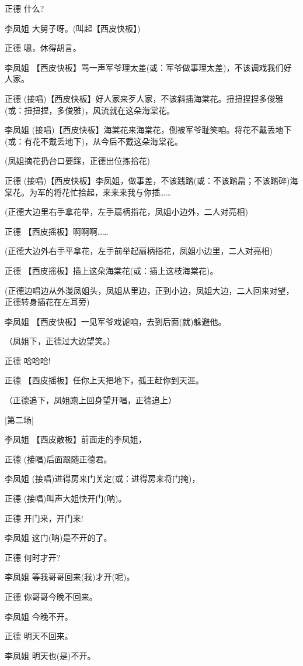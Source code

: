 正德 什么?

李凤姐 大舅子呀。(叫起【西皮快板】)

正德 嗯，休得胡言。

李凤姐
【西皮快板】骂一声军爷理太差(或：军爷做事理太差)，不该调戏我们好人家。

正德
(接唱)【西皮快板】好人家来歹人家，不该斜插海棠花。扭扭捏捏多俊雅(或：扭扭捏，多俊雅)，风流就在这朵海棠花。

李凤姐
(接唱)【西皮快板】海棠花来海棠花，倒被军爷耻笑咱。将花不戴丢地下(或：有花不戴丢地下)，从今后不戴这朵海棠花。

(凤姐摘花扔台口要踩，正德出位拣拾花)

正德
(接唱)【西皮快板】李凤姐，做事差，不该践踏(或：不该踏扁；不该踏碎)海棠花。为军的将花忙拾起，来来来我与你插\ldots{}\ldots{}

(正德大边里右手拿花举，左手扇柄指花，凤姐小边外，二人对亮相)

正德 【西皮摇板】啊啊啊\ldots{}\ldots{}

(正德大边外右手平拿花，左手前举起扇柄指花，凤姐小边里，二人对亮相)

正德 【西皮摇板】插上这朵海棠花(或：插上这枝海棠花)。

(正德边唱边从外漫凤姐头，凤姐从里边，正到小边，凤姐大边，二人回来对望，正德转身插花在左耳旁)

李凤姐 【西皮快板】一见军爷戏谑咱，去到后面(就)躲避他。

（凤姐下，正德过大边望笑。）

正德 哈哈哈!

正德 【西皮摇板】任你上天把地下，孤王赶你到天涯。

（正德追下，凤姐跑上回身望开唱，正德追上）

{[}第二场{]}

李凤姐 【西皮散板】前面走的李凤姐，

正德 (接唱)后面跟随正德君。

李凤姐 (接唱)进得房来门关定(或：进得房来将门掩)，

正德 (接唱)叫声大姐快开门(呐)。

正德 开门来，开门来!

李凤姐 这门(呐)是不开的了。

正德 何时才开?

李凤姐 等我哥哥回来(我)才开(呢)。

正德 你哥哥今晚不回来。

李凤姐 今晚不开。

正德 明天不回来。

李凤姐 明天也(是)不开。

